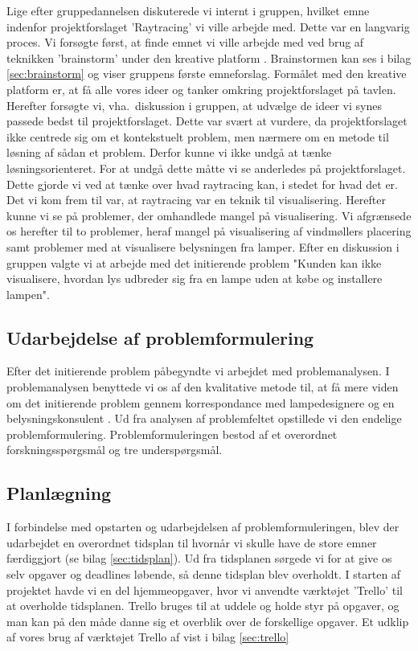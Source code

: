 \documentclass[oneside,a4paper,titlepage]{article}
\begin{document}
Lige efter gruppedannelsen diskuterede vi internt i gruppen, hvilket emne indenfor projektforslaget 'Raytracing' vi ville arbejde med. Dette var en langvarig proces. Vi forsøgte først, at finde emnet vi ville arbejde med ved brug af teknikken 'brainstorm' under den kreative platform \cite{kreativ_platform}. Brainstormen kan ses i bilag \ref{sec:brainstorm} og viser gruppens første emneforslag. Formålet med den kreative platform er, at få alle vores ideer og tanker omkring projektforslaget på tavlen. Herefter forsøgte vi, vha.\ diskussion i gruppen, at udvælge de ideer vi synes passede bedst til projektforslaget. Dette var svært at vurdere, da projektforslaget ikke centrede sig om et kontekstuelt problem, men nærmere om en metode til løsning af sådan et problem. Derfor kunne vi ikke undgå at tænke løsningsorienteret. For at undgå dette måtte vi se anderledes på projektforslaget. Dette gjorde vi ved at tænke over hvad raytracing kan, i stedet for hvad det er. Det vi kom frem til var, at raytracing var en teknik til visualisering. Herefter kunne vi se på problemer, der omhandlede mangel på visualisering. Vi afgrænsede os herefter til to problemer, heraf mangel på visualisering af vindmøllers placering samt problemer med at visualisere belysningen fra lamper. Efter en diskussion i gruppen valgte vi at arbejde med det initierende problem "Kunden kan ikke visualisere, hvordan lys udbreder sig fra en lampe uden at købe og installere lampen". 

\subsection{Udarbejdelse af problemformulering}
Efter det initierende problem påbegyndte vi arbejdet med problemanalysen. I problemanalysen benyttede vi os af den kvalitative metode til, at få mere viden om det initierende problem gennem korrespondance med lampedesignere og en belysningskonsulent \cite{kvalitativ_metode}. Ud fra analysen af problemfeltet opstillede vi den endelige problemformulering. Problemformuleringen bestod af et overordnet forskningsspørgsmål og tre underspørgsmål.

\subsection{Planlægning}
I forbindelse med opstarten og udarbejdelsen af problemformuleringen, blev der udarbejdet en overordnet tidsplan til hvornår vi skulle have de store emner færdiggjort (se bilag \ref{sec:tidsplan}). Ud fra tidsplanen sørgede vi for at give os selv opgaver og deadlines løbende, så denne tidsplan blev overholdt. I starten af projektet havde vi en del hjemmeopgaver, hvor vi anvendte værktøjet 'Trello' til at overholde tidsplanen. Trello bruges til at uddele og holde styr på opgaver, og man kan på den måde danne sig et overblik over de forskellige opgaver. Et udklip af vores brug af værktøjet Trello af vist i bilag \ref{sec:trello}
\newline
\end{document}
